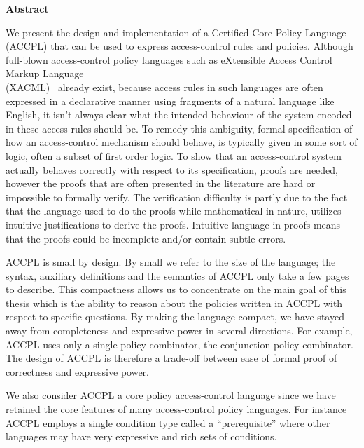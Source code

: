 
\begin{center}\textbf{Abstract}\end{center}

We present the design and implementation of a Certified Core Policy Language (ACCPL) that can be used to express access-control rules and policies. Although full-blown access-control policy languages such as eXtensible Access Control Markup Language \\(XACML)~\cite{xacml3pdf} already exist, because access rules in such languages are often expressed in a declarative manner using fragments of a natural language like English, it isn't always clear what the intended behaviour of the system encoded in these access rules should be. To remedy this ambiguity, formal specification of how an access-control mechanism should behave, is typically given in some sort of logic, often a subset of first order logic. To show that an access-control system actually behaves correctly with respect to its specification, proofs are needed, however the proofs that are often presented in the literature are hard or impossible to formally verify. The verification difficulty is partly due to the fact that the language used to do the proofs while mathematical in nature, utilizes intuitive justifications to derive the proofs. Intuitive language in proofs means that the proofs could be incomplete and/or contain subtle errors.

ACCPL is small by design. By small we refer to the size of the language; the syntax, auxiliary definitions and the semantics of ACCPL only take a few pages to describe. This compactness allows us to concentrate on the main goal of this thesis which is the ability to reason about the policies written in ACCPL with respect to specific questions. By making the language compact, we have stayed away from completeness and expressive power in several directions. For example, ACCPL uses only a single policy combinator, the conjunction policy combinator. The design of ACCPL is therefore a trade-off between ease of formal proof of correctness and expressive power.

We also consider ACCPL a core policy access-control language since we have retained the core features of many access-control policy languages. For instance ACCPL employs a single condition type called a ``prerequisite'' where other languages may have very expressive and rich sets of conditions. 


\cleardoublepage

